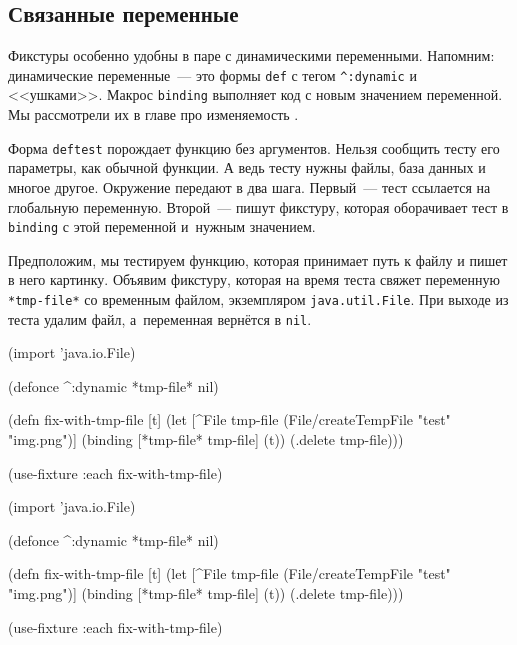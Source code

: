 \subsection{Связанные переменные}


Фикстуры особенно удобны в паре с динамическими переменными. Напомним:
динамические переменные~--- это формы \verb|def| с тегом \verb|^:dynamic| и
<<ушками>>. Макрос \verb|binding| выполняет код с новым
значением переменной. Мы рассмотрели их в главе про
изменяемость .

Форма \verb|deftest| порождает функцию без аргументов. Нельзя сообщить тесту его
параметры, как обычной функции. А ведь тесту нужны файлы, база данных и многое
другое. Окружение передают в два шага. Первый~--- тест ссылается на глобальную
переменную. Второй~--- пишут фикстуру, которая оборачивает тест в \verb|binding|
с этой переменной и~нужным значением.

Предположим, мы тестируем функцию, которая принимает путь к файлу и пишет в него
картинку. Объявим фикстуру, которая на время теста свяжет переменную
\verb|*tmp-file*| со временным файлом, экземпляром \verb|java.util.File|. При
выходе из теста удалим файл, а~переменная вернётся в \verb|nil|.


\ifx\devicetype\mobile

\begin{english}
  \begin{clojure}
(import 'java.io.File)

(defonce ^:dynamic *tmp-file* nil)

(defn fix-with-tmp-file [t]
  (let [^File tmp-file
        (File/createTempFile
          "test" "img.png")]
    (binding [*tmp-file* tmp-file]
      (t))
    (.delete tmp-file)))

(use-fixture :each fix-with-tmp-file)
  \end{clojure}
\end{english}

\else

\begin{english}
  \begin{clojure}
(import 'java.io.File)

(defonce ^:dynamic *tmp-file* nil)

(defn fix-with-tmp-file [t]
  (let [^File tmp-file (File/createTempFile "test" "img.png")]
    (binding [*tmp-file* tmp-file]
      (t))
    (.delete tmp-file)))

(use-fixture :each fix-with-tmp-file)
  \end{clojure}
\end{english}

